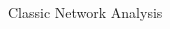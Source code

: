 \documentclass[10pt]{beamer}
\begin{document}
\begin{frame}[t]{Classic Network Analysis}
\begin{textblock*}{62mm}
{}
\end{textblock*}

\end{frame}
\end{document}
